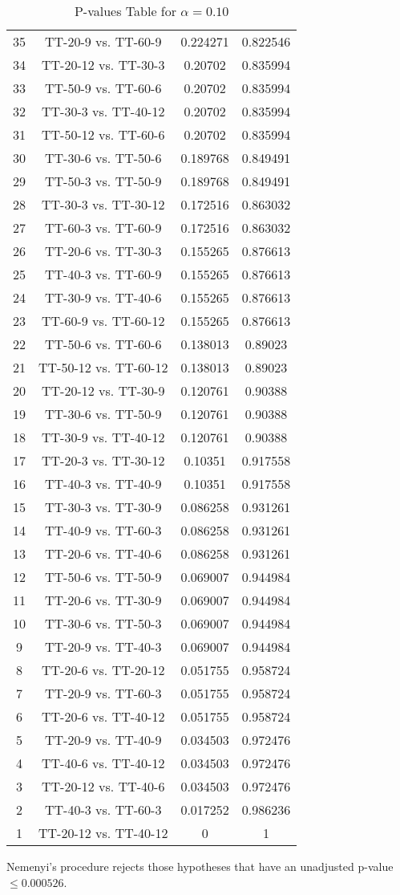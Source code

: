 \documentclass[a4paper,10pt]{article}
\begin{document}
\begin{landscape}
\begin{table}[!htp]
\begin{tabular}{cccc}
35&TT-20-9 vs. TT-60-9&0.224271&0.822546\\
34&TT-20-12 vs. TT-30-3&0.20702&0.835994\\
33&TT-50-9 vs. TT-60-6&0.20702&0.835994\\
32&TT-30-3 vs. TT-40-12&0.20702&0.835994\\
31&TT-50-12 vs. TT-60-6&0.20702&0.835994\\
30&TT-30-6 vs. TT-50-6&0.189768&0.849491\\
29&TT-50-3 vs. TT-50-9&0.189768&0.849491\\
28&TT-30-3 vs. TT-30-12&0.172516&0.863032\\
27&TT-60-3 vs. TT-60-9&0.172516&0.863032\\
26&TT-20-6 vs. TT-30-3&0.155265&0.876613\\
25&TT-40-3 vs. TT-60-9&0.155265&0.876613\\
24&TT-30-9 vs. TT-40-6&0.155265&0.876613\\
23&TT-60-9 vs. TT-60-12&0.155265&0.876613\\
22&TT-50-6 vs. TT-60-6&0.138013&0.89023\\
21&TT-50-12 vs. TT-60-12&0.138013&0.89023\\
20&TT-20-12 vs. TT-30-9&0.120761&0.90388\\
19&TT-30-6 vs. TT-50-9&0.120761&0.90388\\
18&TT-30-9 vs. TT-40-12&0.120761&0.90388\\
17&TT-20-3 vs. TT-30-12&0.10351&0.917558\\
16&TT-40-3 vs. TT-40-9&0.10351&0.917558\\
15&TT-30-3 vs. TT-30-9&0.086258&0.931261\\
14&TT-40-9 vs. TT-60-3&0.086258&0.931261\\
13&TT-20-6 vs. TT-40-6&0.086258&0.931261\\
12&TT-50-6 vs. TT-50-9&0.069007&0.944984\\
11&TT-20-6 vs. TT-30-9&0.069007&0.944984\\
10&TT-30-6 vs. TT-50-3&0.069007&0.944984\\
9&TT-20-9 vs. TT-40-3&0.069007&0.944984\\
8&TT-20-6 vs. TT-20-12&0.051755&0.958724\\
7&TT-20-9 vs. TT-60-3&0.051755&0.958724\\
6&TT-20-6 vs. TT-40-12&0.051755&0.958724\\
5&TT-20-9 vs. TT-40-9&0.034503&0.972476\\
4&TT-40-6 vs. TT-40-12&0.034503&0.972476\\
3&TT-20-12 vs. TT-40-6&0.034503&0.972476\\
2&TT-40-3 vs. TT-60-3&0.017252&0.986236\\
1&TT-20-12 vs. TT-40-12&0&1\\
\hline
\end{tabular}
\caption{P-values Table for $\alpha=0.10$}
\end{table}Nemenyi's procedure rejects those hypotheses that have an unadjusted p-value $\le0.000526$.


\end{landscape}
\end{document}
